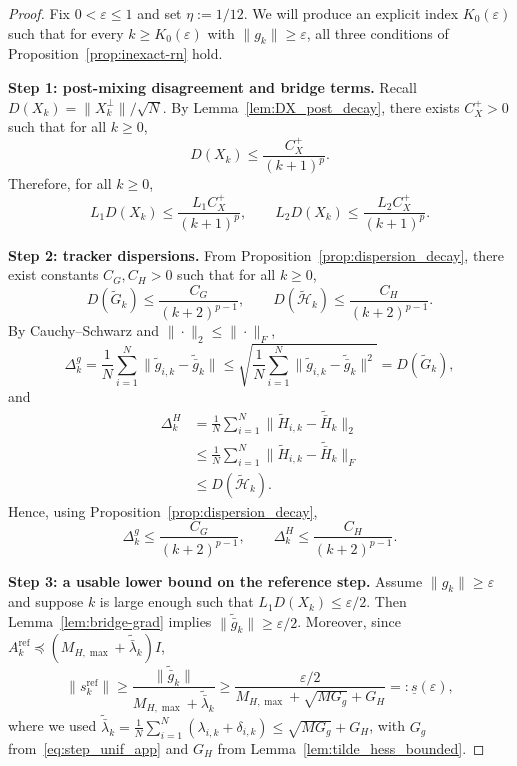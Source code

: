 \documentclass[review,onefignum,onetabnum]{siamart171218}
\begin{document}
	\begin{proof}
		Fix $0<\varepsilon\le1$ and set $\eta:=1/12$.
		We will produce an explicit index $K_0(\varepsilon)$ such that for every $k\ge K_0(\varepsilon)$ with $\|g_k\|\ge \varepsilon$,
		all three conditions of Proposition~\ref{prop:inexact-rn} hold.
		
		\smallskip
		\noindent\textbf{Step 1: post-mixing disagreement and bridge terms.}
		Recall $D(X_k)=\|X_k^\perp\|/\sqrt N$.
		By Lemma~\ref{lem:DX_post_decay}, there exists $C_X^{+}>0$ such that for all $k\ge 0$,
		\begin{equation}\label{eq:DX_post_decay_app}
			D(X_k)\le \frac{C_X^{+}}{(k+1)^p}.
		\end{equation}
		Therefore, for all $k\ge 0$,
		\begin{equation}\label{eq:bridge_targets_app}
			L_1D(X_k)\le \frac{L_1C_X^{+}}{(k+1)^p},
			\qquad
			L_2D(X_k)\le \frac{L_2C_X^{+}}{(k+1)^p}.
		\end{equation}
		
		\smallskip
		\noindent\textbf{Step 2: tracker dispersions.}
		From Proposition~\ref{prop:dispersion_decay}, there exist constants $C_G,C_H>0$ such that for all $k\ge 0$,
		\begin{equation}\label{eq:GH_decay_app}
			D(\tilde G_k)\le \frac{C_G}{(k+2)^{p-1}},
			\qquad
			D(\tilde{\mathcal H}_k)\le \frac{C_H}{(k+2)^{p-1}}.
		\end{equation}
		By Cauchy--Schwarz and $\|\cdot\|_2\le \|\cdot\|_F$,
		\[
		\Delta_k^g
		=\frac1N\sum_{i=1}^N\|\tilde g_{i,k}-\tilde{\bar g}_k\|
		\le \sqrt{\frac1N\sum_{i=1}^N\|\tilde g_{i,k}-\tilde{\bar g}_k\|^2}
		= D(\tilde G_k),
		\]
		and
		\begin{align*}
			\Delta_k^H
			&=\tfrac1N\textstyle\sum_{i=1}^N\big\|\tilde H_{i,k}\!-\!\tilde{\bar H}_k\big\|_2\\
			&\le \tfrac1N\textstyle\sum_{i=1}^N\big\|\tilde H_{i,k}\!-\!\tilde{\bar H}_k\big\|_F\\
			&\le D(\tilde{\mathcal H}_k).
		\end{align*}
		Hence, using Proposition~\ref{prop:dispersion_decay},
		\begin{equation}\label{eq:Delta_decay_app}
			\Delta_k^g\le \frac{C_G}{(k+2)^{p-1}},
			\qquad
			\Delta_k^H\le \frac{C_H}{(k+2)^{p-1}}.
		\end{equation}
		
		\smallskip
		\noindent\textbf{Step 3: a usable lower bound on the reference step.}
		Assume $\|g_k\|\ge \varepsilon$ and suppose $k$ is large enough such that $L_1D(X_k)\le \varepsilon/2$.
		Then Lemma~\ref{lem:bridge-grad} implies
		$\|\tilde{\bar g}_k\|\ge \varepsilon/2$.
		Moreover, since $A_k^{\mathrm{ref}}\preceq (M_{H,\max}+\tilde{\bar\lambda}_k)I$,
		\[
		\|s_k^{\mathrm{ref}}\|
		\ge \frac{\|\tilde{\bar g}_k\|}{M_{H,\max}+\tilde{\bar\lambda}_k}
		\ge \frac{\varepsilon/2}{M_{H,\max}+\sqrt{MG_g}+G_H}
		=:\underline s(\varepsilon),
		\]
		where we used $\tilde{\bar\lambda}_k=\frac{1}{N}\sum_{i=1}^N(\lambda_{i,k}+\delta_{i,k})\le \sqrt{MG_g}+G_H$, with $G_g$ from~\eqref{eq:step_unif_app} and $G_H$ from Lemma~\ref{lem:tilde_hess_bounded}.
		

\end{proof}
\end{document}
